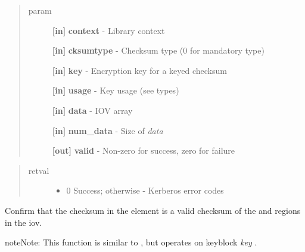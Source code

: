 \documentclass[letterpaper,10pt,english]{sphinxmanual}
\begin{document}
\begin{quote}\begin{description}
\item[{param}] \leavevmode
\textbf{{[}in{]}} \textbf{context} - Library context

\textbf{{[}in{]}} \textbf{cksumtype} - Checksum type (0 for mandatory type)

\textbf{{[}in{]}} \textbf{key} - Encryption key for a keyed checksum

\textbf{{[}in{]}} \textbf{usage} - Key usage (see  types)

\textbf{{[}in{]}} \textbf{data} - IOV array

\textbf{{[}in{]}} \textbf{num\_data} - Size of \emph{data}

\textbf{{[}out{]}} \textbf{valid} - Non-zero for success, zero for failure

\end{description}\end{quote}
\begin{quote}\begin{description}
\item[{retval}] \leavevmode\begin{itemize}
\item {} 
0   Success; otherwise - Kerberos error codes

\end{itemize}

\end{description}\end{quote}

Confirm that the checksum in the {\hyperref[appdev/refs/macros/KRB5_CRYPTO_TYPE_CHECKSUM:KRB5_CRYPTO_TYPE_CHECKSUM]{}} element is a valid checksum of the {\hyperref[appdev/refs/macros/KRB5_CRYPTO_TYPE_DATA:KRB5_CRYPTO_TYPE_DATA]{}} and {\hyperref[appdev/refs/macros/KRB5_CRYPTO_TYPE_SIGN_ONLY:KRB5_CRYPTO_TYPE_SIGN_ONLY]{}} regions in the iov.




{\hyperref[appdev/refs/api/krb5_c_make_checksum_iov:c.krb5_c_make_checksum_iov]{}}



\begin{notice}{note}{Note:}
This function is similar to {\hyperref[appdev/refs/api/krb5_k_verify_checksum_iov:c.krb5_k_verify_checksum_iov]{}} , but operates on keyblock \emph{key} .
\end{notice}
\end{document}
